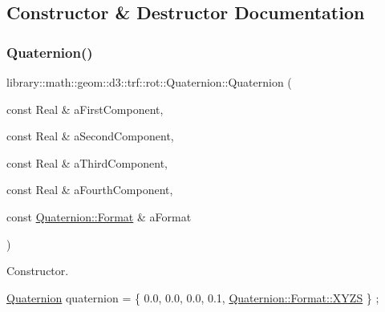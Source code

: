 \subsection{Constructor \& Destructor Documentation}
\mbox{\label{classlibrary_1_1math_1_1geom_1_1d3_1_1trf_1_1rot_1_1_quaternion_a1b8794cce68c5ee86dd50f9ba53635fa}} 
\subsubsection{\texorpdfstring{Quaternion()}{Quaternion()}\hspace{0.1cm}{\footnotesize\ttfamily [1/3]}}
{\footnotesize\ttfamily library\+::math\+::geom\+::d3\+::trf\+::rot\+::\+Quaternion\+::\+Quaternion (\begin{DoxyParamCaption}\item[{const Real \&}]{a\+First\+Component,  }\item[{const Real \&}]{a\+Second\+Component,  }\item[{const Real \&}]{a\+Third\+Component,  }\item[{const Real \&}]{a\+Fourth\+Component,  }\item[{const \hyperlink{classlibrary_1_1math_1_1geom_1_1d3_1_1trf_1_1rot_1_1_quaternion_aa86c54f6157891b2f1a517c672d6deec}{Quaternion\+::\+Format} \&}]{a\+Format }\end{DoxyParamCaption})}



Constructor. 


\begin{DoxyCode}
\hyperlink{classlibrary_1_1math_1_1geom_1_1d3_1_1trf_1_1rot_1_1_quaternion_a1b8794cce68c5ee86dd50f9ba53635fa}{Quaternion} quaternion = \{ 0.0, 0.0, 0.0, 0.1, \hyperlink{classlibrary_1_1math_1_1geom_1_1d3_1_1trf_1_1rot_1_1_quaternion_aa86c54f6157891b2f1a517c672d6deeca11c51ecd5dc6f86ba3c1ae79e21482f5}{Quaternion::Format::XYZS} \} 
      ;
\end{DoxyCode}



